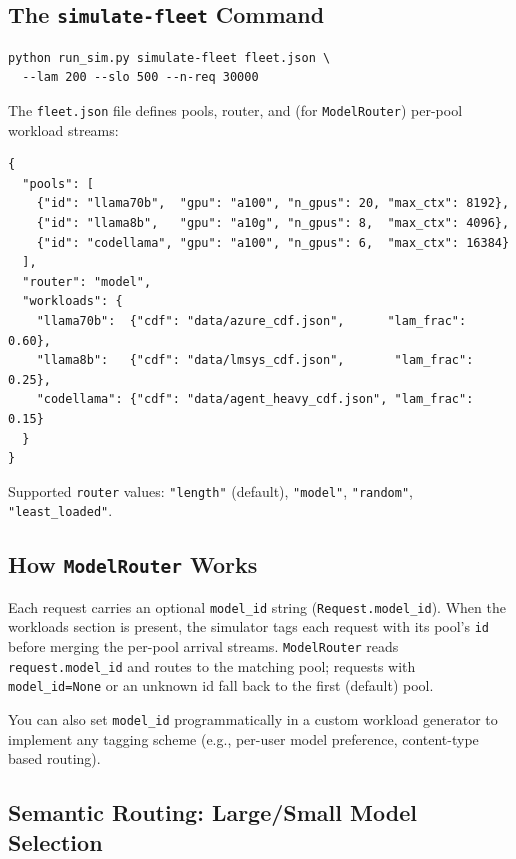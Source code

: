 \documentclass[11pt,a4paper]{article}
\begin{document}
\subsection{The \texttt{simulate-fleet} Command}

\begin{lstlisting}[style=shell]
python run_sim.py simulate-fleet fleet.json \
  --lam 200 --slo 500 --n-req 30000
\end{lstlisting}

The \texttt{fleet.json} file defines pools, router, and (for
\texttt{ModelRouter}) per-pool workload streams:

\begin{lstlisting}[style=python]
{
  "pools": [
    {"id": "llama70b",  "gpu": "a100", "n_gpus": 20, "max_ctx": 8192},
    {"id": "llama8b",   "gpu": "a10g", "n_gpus": 8,  "max_ctx": 4096},
    {"id": "codellama", "gpu": "a100", "n_gpus": 6,  "max_ctx": 16384}
  ],
  "router": "model",
  "workloads": {
    "llama70b":  {"cdf": "data/azure_cdf.json",      "lam_frac": 0.60},
    "llama8b":   {"cdf": "data/lmsys_cdf.json",       "lam_frac": 0.25},
    "codellama": {"cdf": "data/agent_heavy_cdf.json", "lam_frac": 0.15}
  }
}
\end{lstlisting}

Supported \texttt{router} values:
\texttt{"length"} (default),
\texttt{"model"},
\texttt{"random"},
\texttt{"least\_loaded"}.

\subsection{How \texttt{ModelRouter} Works}

Each request carries an optional \texttt{model\_id} string
(\texttt{Request.model\_id}).  When the workloads section is present,
the simulator tags each request with its pool's \texttt{id} before
merging the per-pool arrival streams.  \texttt{ModelRouter} reads
\texttt{request.model\_id} and routes to the matching pool; requests
with \texttt{model\_id=None} or an unknown id fall back to the first
(default) pool.

You can also set \texttt{model\_id} programmatically in a custom
workload generator to implement any tagging scheme
(e.g., per-user model preference, content-type based routing).

\subsection{Semantic Routing: Large/Small Model Selection}
\label{sec:semantic}
\end{document}
